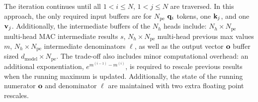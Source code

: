 \documentclass[sigconf]{acmart}
\begin{document}
The iteration continues until all \( 1 < i \leq N \), \( 1 < j \leq N \) are traversed. In this approach, the only required input buffers are for \( N_{\text{pe}} \) \( {\bf q}_i \) tokens, one \( {\bf k}_j \), and one \( {\bf v}_j \). Additionally, the intermediate buffers of the $N_{h}$ heads include: \( N_{h} \times N_{\text{pe}} \) multi-head MAC intermediate results \( s \), \( N_{h} \times N_{\text{pe}} \) multi-head previous max values \( m \), \( N_{h} \times N_{\text{pe}} \) intermediate denominators \( \ell \), as well as the output vector $\bf o$ buffer sized $d_{\text{model}} \times N_{\text{pe}}$. The trade-off also includes minor computational overhead: an additional exponentiation, $e^{m^{(i-1)} - m^{(i)}}$, is required to rescale previous results when the running maximum is updated. Additionally, the state of the running numerator $\bf{o}$ and denominator $\ell$ are maintained with two extra floating point rescales. 
\end{document}
